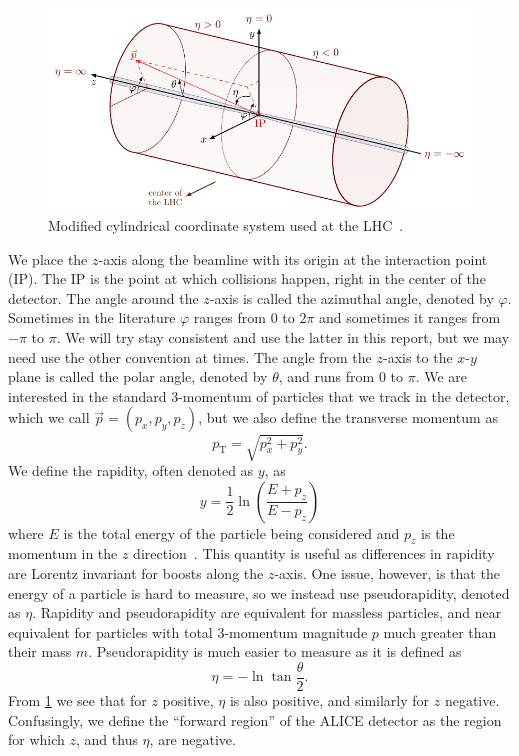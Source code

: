 \documentclass[11pt]{article}
\numberwithin{equation}{section}
\numberwithin{figure}{section}
\numberwithin{table}{section}
\begin{document}
\begin{figure}[h]
    \begin{center}
        \includegraphics[width=.8\textwidth]{Figs/coords.pdf}
        \caption{Modified cylindrical coordinate system used at the LHC~\cite{coords}.}
        \label{fig:coords}
    \end{center}
\end{figure}

We place the $z$-axis along the beamline with its origin at the interaction point (IP). The IP is the point at which collisions happen, right in the center of the detector. The angle around the $z$-axis is called the azimuthal angle, denoted by $\varphi$. Sometimes in the literature $\varphi$ ranges from 0 to $2\pi$ and sometimes it ranges from $-\pi$ to $\pi$. We will try stay consistent and use the latter in this report, but we may need use the other convention at times. The angle from the $z$-axis to the $x$-$y$ plane is called the polar angle, denoted by $\theta$, and runs from 0 to $\pi$. We are interested in the standard 3-momentum of particles that we track in the detector, which we call $\vec{p}=(p_x,p_y,p_z)$, but we also define the transverse momentum as 
\begin{equation}
    p_{\mathrm{T}}=\sqrt{p_x^2 + p_y^2}.
    \label{eqn:transverse momentum}
\end{equation}
We define the rapidity, often denoted as $y$, as
\begin{equation}
    y=\frac 12 \ln\left(\frac{E+p_z}{E-p_z}\right)
    \label{eqn:rapidity}
\end{equation}
where $E$ is the total energy of the particle being considered and $p_z$ is the momentum in the $z$ direction~\cite{kar_exp_phys}. This quantity is useful as differences in rapidity are Lorentz invariant for boosts along the $z$-axis. One issue, however, is that the energy of a particle is hard to measure, so we instead use pseudorapidity, denoted as $\eta$. Rapidity and pseudorapidity are equivalent for massless particles, and near equivalent for particles with total 3-momentum magnitude $p$ much greater than their mass $m$. Pseudorapidity is much easier to measure as it is defined as~\cite{kar_exp_phys}
\begin{equation}
    \eta=-\ln\tan\frac{\theta}{2}.
    \label{eqn:pseudorapidity}
\end{equation}
From \cref{fig:coords} we see that for $z$ positive, $\eta$ is also positive, and similarly for $z$ negative. Confusingly, we define the ``forward region'' of the ALICE detector as the region for which $z$, and thus $\eta$, are negative. 
\end{document}
